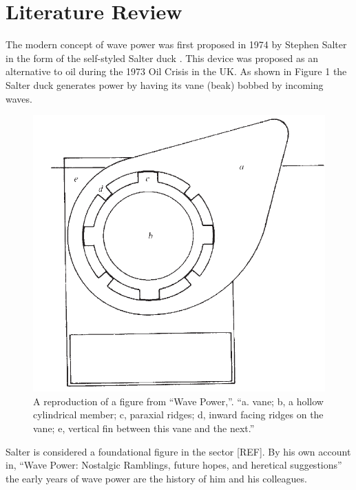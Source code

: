 \documentclass{report}
\begin{document}
\chapter{Literature Review}
The modern concept of wave power was first proposed in 1974 by Stephen Salter in the form of the self-styled Salter duck \cite{salterDuck}. This device was proposed as an alternative to oil during the 1973 Oil Crisis in the UK. As shown in Figure 1 the Salter duck generates power by having its vane (beak) bobbed by incoming waves.

\begin{figure}
\centering
\label{fig:duck}
\includegraphics[scale=0.25]{graphics/duck}
\caption{A reproduction of a figure from ``Wave Power,''\cite{salterDuck}. ``a. vane; b, a hollow cylindrical member; c, paraxial ridges; d, inward facing ridges on the vane; e, vertical fin between this vane and the next.''}
\end{figure}

Salter is considered a foundational figure in the sector [REF]. By his own account in, ``Wave Power: Nostalgic Ramblings, future hopes, and heretical suggestions'' \cite{salterRamble} the early years of wave power are the history of him and his colleagues.
\end{document}

